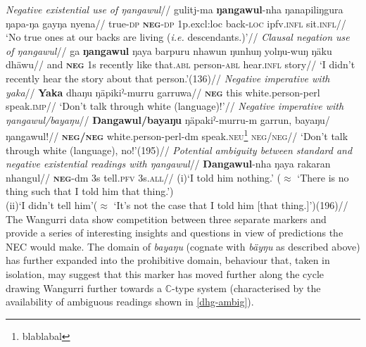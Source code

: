 \pex\a\begingl\glpreamble \textit{Negative existential use of {\em ŋangawul}}//
\gla gulitj-ma \textbf{ŋangawul}-nha ŋanapiliŋgura ŋapa-ŋa gayŋa nyena//
\glb true-\textsc{dp} \textsc{\textbf{neg}-dp} 1\gls{p}.\gls{excl}{:loc} back\textsc{-loc} \gls{ipfv}.\textsc{infl} sit.\textsc{infl}//
\glft`No true ones at our backs are living (\textit{i.e.} descendants.)'//
\endgl
\a\begingl\glpreamble\textit{Clausal negation use of {\em ŋangawul}}//
\gla ga \textbf{ŋangawul} ŋaya barpuru nhawun ŋunhuŋ yolŋu-wuŋ ŋäku dhäwu//
\glb and \textsc{\textbf{neg}} \gls{1}\gls{s} recently like that.\textsc{abl} person\textsc{-abl} hear\textsc{.infl} story//
\glft `I didn't recently hear the story about that person.'\trailingcitation(136)//
\endgl
\a\begingl\glpreamble\textit{Negative imperative with {\em yaka}}//
\gla \textbf{Yaka} dhaŋu ŋäpikiˀ-murru garruwa//
\glb \textsc{\textbf{neg}} this white.person-\gls{perl} speak\textsc{.imp}//
\glft`Don't talk through white (language)!'//
\endgl
\a\begingl\glpreamble\textit{Negative imperative with \emph{ŋangawul/bayaŋu}}//
\gla \textbf{Ŋangawul/bayaŋu} ŋäpakiˀ-murru-m garrun, bayaŋu/ŋangawul!//
\glb \textsc{\textbf{neg/neg}} white.person-\gls{perl}-\gls{dm} speak\textsc{.neu}\footnote{blablabal} \textsc{neg/neg}//
\glft `Don't talk through white (language), no!'\trailingcitation(195)//\endgl
\a\label{dhg-ambig}\begingl\glpreamble\textit{Potential ambiguity between standard and negative existential readings with \emph{ŋangawul}}//
\gla \textbf{Ŋangawul}-nha ŋaya rakaran nhangul//
\glb \textsc{\textbf{neg}}-\gls{dm} \gls{3}\gls{s} tell.\textsc{pfv} 3s.\textsc{all}//
\glft(i)\quad`I told him nothing.' ($\approx$ `There is no thing such that I told him that thing.')\\
(ii)\quad `I didn't tell him'($\approx$ `It's not the case that I told him [that thing.]')\trailingcitation(196)//\endgl
\xe
{}
The Wangurri data show competition between three separate markers and provide a series of interesting insights and questions in view of predictions the \acrshort{NEC} would make. The domain of \textit{bayaŋu} (cognate with \textit{bäyŋu} as described above) has further expanded into the prohibitive domain, behaviour that, taken in isolation, may suggest that this marker has moved further along the cycle drawing Wangurri further towards a $\mathbb C$-type system (characterised by the availability of ambiguous readings shown in \ref{dhg-ambig}).

